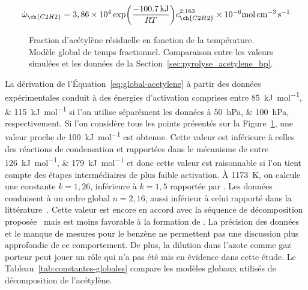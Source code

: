 \begin{equation}
\dot{\omega}_{\ch{C2H2}}={3,86\times{}10^4}
\exp\biggr(\frac{-\SI{100,7}{\kilo\joule}}{RT}\biggr)c_{\ch{C2H2}}^{2,163}{}\times{}10^{-6}\si{\mole\per\cubic\centi\metre\per\second}
\label{eq:global-acetylene}
\end{equation}

\begin{figure}[h]
  \centering{}
    
  \caption{\label{fig:plug-flow-fit}Fraction d'acétylène résiduelle en fonction de la température. Modèle global de temps fractionnel. Comparaison entre les valeurs simulées et les données de la Section~\ref{sec:pyrolyse_acetylene_bp}.}
\end{figure}

La dérivation de l'Équation~\ref{eq:global-acetylene} à partir des données expérimentales conduit à des énergies d'activation comprises entre \SIlist{85;115}{\kilo\joule\per\mole} si l'on utilise séparément les données à \SIlist{50;100}{\hecto\pascal}, respectivement. Si l'on considère tous les points présentés sur la Figure~\ref{fig:plug-flow-fit}, une valeur proche de \SI{100}{\kilo\joule\per\mole} est obtenue. Cette valeur est inférieure à celles des réactions de condensation  et  rapportées dans le mécanisme de \citet{Norinaga2009} \textendash{} entre \SIlist{126;179}{\kilo\joule\per\mole} \textendash{} et donc cette valeur est raisonnable si l'on tient compte des étapes intermédiaires de plus faible activation. À \SI{1173}{\kelvin}, on calcule une constante $k=1,26$, inférieure à $k=1,5$ rapportée par \citet{Norinaga2005}. Les données conduisent à un ordre global $n=2,16$, aussi inférieur à celui rapporté dans la littérature~\cite{Norinaga2005}. Cette valeur est encore en accord avec la séquence de décomposition proposée~\cite{Norinaga2005,Becker1998177} mais est moins favorable à la formation de . La précision des données et le manque de mesures pour le benzène ne permettent pas une discussion plus approfondie de ce comportement. De plus, la dilution dans l'azote comme gaz porteur peut jouer un rôle qui n'a pas été mis en évidence dans cette étude. Le Tableau~\ref{tab:constantes-globales} compare les modèles globaux utilisés de décomposition de l'acétylène.

